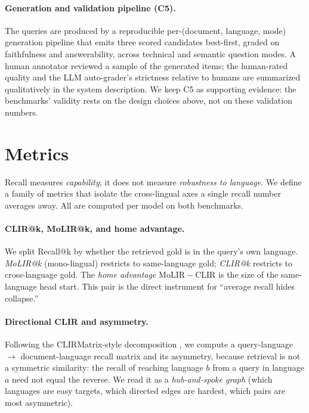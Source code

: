 \documentclass[11pt]{article}
\begin{document}
\paragraph{Generation and validation pipeline (C5).}
The queries are produced by a reproducible per-(document, language, mode)
generation pipeline that emits three scored candidates best-first, graded on
faithfulness and answerability, across technical and semantic question modes. A
human annotator reviewed a sample of the generated items; the human-rated
quality and the LLM auto-grader's strictness relative to humans are summarized
qualitatively in the system description. We keep C5 as supporting evidence: the
benchmarks' validity rests on the design choices above, not on these validation
numbers.

\section{Metrics}
\label{sec:metrics}

Recall measures \emph{capability}; it does not measure \emph{robustness to
language}. We define a family of metrics that isolate the cross-lingual axes a
single recall number averages away. All are computed per model on both
benchmarks.

\paragraph{CLIR@k, MoLIR@k, and home advantage.}
We split Recall@k by whether the retrieved gold is in the query's own language.
\emph{MoLIR@k} (mono-lingual) restricts to same-language gold; \emph{CLIR@k}
restricts to cross-language gold. The \emph{home advantage}
$\mathrm{MoLIR}{-}\mathrm{CLIR}$ is the size of the same-language head start.
This pair is the direct instrument for ``average recall hides collapse.''

\paragraph{Directional CLIR and asymmetry.}
Following the CLIRMatrix-style decomposition \citep{clirmatrix2020}, we compute a
query-language $\rightarrow$ document-language recall matrix and its asymmetry,
because retrieval is not a symmetric similarity: the recall of reaching language
$b$ from a query in language $a$ need not equal the reverse. We read it as a
\emph{hub-and-spoke graph} (which languages are easy targets, which directed
edges are hardest, which pairs are most asymmetric).
\end{document}
